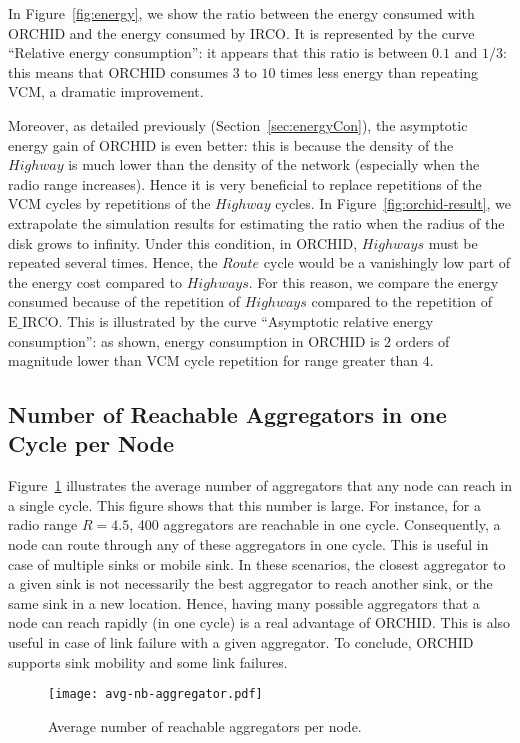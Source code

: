 In Figure~\ref{fig:energy}, we show the ratio between the energy 
consumed with ORCHID and the energy consumed by IRCO. It is represented by the curve ``Relative energy consumption'': it appears that this ratio is between 
$0.1$ and $1/3$: this means that ORCHID consumes $3$ to $10$ times less
energy than repeating VCM, a dramatic improvement.

Moreover, as detailed previously (Section~\ref{sec:energyCon}), the asymptotic energy gain of ORCHID is 
even better: this is because the density of the $Highway$ is much lower
than the density of the network (especially when the radio range increases).
Hence it is very beneficial to replace repetitions of the VCM cycles by
repetitions of the $Highway$ cycles. In Figure~\ref{fig:orchid-result},
we extrapolate the simulation results for estimating the ratio when
the radius of the disk grows to infinity. Under this condition, in ORCHID, $Highways$ must be repeated several times. Hence, the $Route$ cycle would be a vanishingly low part of the energy cost compared to $Highways$. For this reason, we compare the energy consumed because of the repetition of $Highways$ compared to the repetition of $\mathrm{E\_{IRCO}}$.
This is illustrated by the curve ``Asymptotic relative energy consumption'':
as shown, energy consumption in ORCHID is $2$ orders of magnitude lower
than VCM cycle repetition for range greater than $4$.





\subsection{Number of Reachable Aggregators in one Cycle per Node}\label{sec:reachAgg}
Figure~\ref{avgNbAgg} illustrates the average number of aggregators that any node can reach in a single cycle. 
This figure shows that this number is large. For instance, for a radio range $R=4.5$, 400 aggregators are reachable in one cycle. Consequently, a node can route through any of these aggregators in one cycle. This is useful in case of multiple sinks or mobile sink. In these scenarios, the closest aggregator to a given sink is not necessarily the best aggregator to reach another sink, or the same sink in a new location. Hence, having many possible aggregators that a node can reach rapidly (in one cycle)    is a real advantage of ORCHID.
This is also useful in case of link failure with a given aggregator. To conclude, ORCHID supports sink mobility and some link failures. 


\begin{figure}[h!]
\centering
\texttt{[image: avg-nb-aggregator.pdf]}
\caption{Average number of reachable aggregators per node.
\label{avgNbAgg}}
\end{figure} 
